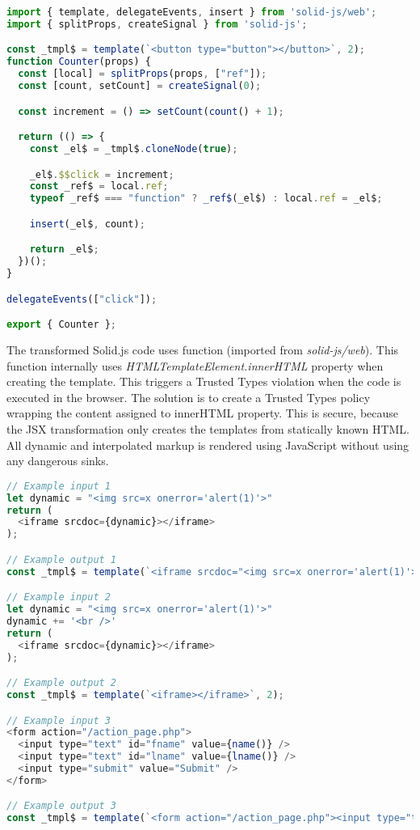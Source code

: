 \bigskip
\begin{lstlisting}[language=JavaScript, caption=Example of a Solid.js component after Babel transformation]
import { template, delegateEvents, insert } from 'solid-js/web';
import { splitProps, createSignal } from 'solid-js';

const _tmpl$ = template(`<button type="button"></button>`, 2);
function Counter(props) {
  const [local] = splitProps(props, ["ref"]);
  const [count, setCount] = createSignal(0);

  const increment = () => setCount(count() + 1);

  return (() => {
    const _el$ = _tmpl$.cloneNode(true);

    _el$.$$click = increment;
    const _ref$ = local.ref;
    typeof _ref$ === "function" ? _ref$(_el$) : local.ref = _el$;

    insert(_el$, count);

    return _el$;
  })();
}

delegateEvents(["click"]);

export { Counter };
\end{lstlisting}

The transformed Solid.js code uses  function (imported from \emph{solid-js/web}).
This function internally uses \emph{HTMLTemplateElement.innerHTML} property when creating the
template. This triggers a Trusted Types violation when the code is executed in the browser. The
solution is to create a Trusted Types policy wrapping the content assigned to innerHTML property.
This is secure, because the JSX transformation only creates the templates from statically known
HTML. All dynamic and interpolated markup is rendered using JavaScript without using any dangerous
sinks.

\bigskip
\begin{lstlisting}[language=JavaScript, caption=Examples of JSX transformations]
// Example input 1
let dynamic = "<img src=x onerror='alert(1)'>"
return (
  <iframe srcdoc={dynamic}></iframe>
);

// Example output 1
const _tmpl$ = template(`<iframe srcdoc="<img src=x onerror='alert(1)'>"></iframe>`, 3);

// Example input 2
let dynamic = "<img src=x onerror='alert(1)'>"
dynamic += '<br />'
return (
  <iframe srcdoc={dynamic}></iframe>
);

// Example output 2
const _tmpl$ = template(`<iframe></iframe>`, 2);

// Example input 3
<form action="/action_page.php">
  <input type="text" id="fname" value={name()} />
  <input type="text" id="lname" value={lname()} />
  <input type="submit" value="Submit" />
</form>

// Example output 3
const _tmpl$ = template(`<form action="/action_page.php"><input type="text" id="fname"><input type="text" id="lname"><input type="submit" value="Submit"></form>`, 5);
\end{lstlisting}

